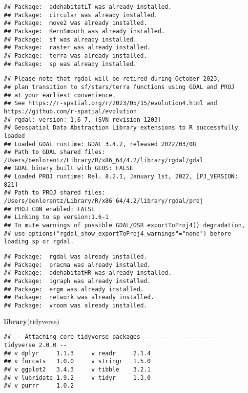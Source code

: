 \documentclass[
]{article}
\newenvironment{Shaded}{\begin{snugshade}}{\end{snugshade}}
\newcommand{\FunctionTok}[1]{\textcolor[rgb]{0.13,0.29,0.53}{\textbf{#1}}}
\newcommand{\NormalTok}[1]{#1}
\begin{document}
\begin{verbatim}
## Package:  adehabitatLT was already installed.
## Package:  circular was already installed.
## Package:  move2 was already installed.
## Package:  KernSmooth was already installed.
## Package:  sf was already installed.
## Package:  raster was already installed.
## Package:  terra was already installed.
## Package:  sp was already installed.
\end{verbatim}

\begin{verbatim}
## Please note that rgdal will be retired during October 2023,
## plan transition to sf/stars/terra functions using GDAL and PROJ
## at your earliest convenience.
## See https://r-spatial.org/r/2023/05/15/evolution4.html and https://github.com/r-spatial/evolution
## rgdal: version: 1.6-7, (SVN revision 1203)
## Geospatial Data Abstraction Library extensions to R successfully loaded
## Loaded GDAL runtime: GDAL 3.4.2, released 2022/03/08
## Path to GDAL shared files: /Users/benlorentz/Library/R/x86_64/4.2/library/rgdal/gdal
## GDAL binary built with GEOS: FALSE 
## Loaded PROJ runtime: Rel. 8.2.1, January 1st, 2022, [PJ_VERSION: 821]
## Path to PROJ shared files: /Users/benlorentz/Library/R/x86_64/4.2/library/rgdal/proj
## PROJ CDN enabled: FALSE
## Linking to sp version:1.6-1
## To mute warnings of possible GDAL/OSR exportToProj4() degradation,
## use options("rgdal_show_exportToProj4_warnings"="none") before loading sp or rgdal.
\end{verbatim}

\begin{verbatim}
## Package:  rgdal was already installed.
## Package:  pracma was already installed.
## Package:  adehabitatHR was already installed.
## Package:  igraph was already installed.
## Package:  ergm was already installed.
## Package:  network was already installed.
## Package:  vroom was already installed.
\end{verbatim}

\begin{Shaded}
\begin{Highlighting}[]
\FunctionTok{library}\NormalTok{(tidyverse)}
\end{Highlighting}
\end{Shaded}

\begin{verbatim}
## -- Attaching core tidyverse packages ------------------------ tidyverse 2.0.0 --
## v dplyr     1.1.3     v readr     2.1.4
## v forcats   1.0.0     v stringr   1.5.0
## v ggplot2   3.4.3     v tibble    3.2.1
## v lubridate 1.9.2     v tidyr     1.3.0
## v purrr     1.0.2
\end{verbatim}
\end{document}
